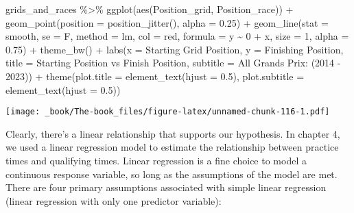 \documentclass[
]{book}
\newenvironment{Shaded}{\begin{snugshade}}{\end{snugshade}}
\newcommand{\AttributeTok}[1]{\textcolor[rgb]{0.77,0.63,0.00}{#1}}
\newcommand{\DecValTok}[1]{\textcolor[rgb]{0.00,0.00,0.81}{#1}}
\newcommand{\FloatTok}[1]{\textcolor[rgb]{0.00,0.00,0.81}{#1}}
\newcommand{\FunctionTok}[1]{\textcolor[rgb]{0.00,0.00,0.00}{#1}}
\newcommand{\NormalTok}[1]{#1}
\newcommand{\SpecialCharTok}[1]{\textcolor[rgb]{0.00,0.00,0.00}{#1}}
\newcommand{\StringTok}[1]{\textcolor[rgb]{0.31,0.60,0.02}{#1}}
\begin{document}
\begin{Shaded}
\begin{Highlighting}[]
\NormalTok{grids\_and\_races }\SpecialCharTok{\%\textgreater{}\%}
  \FunctionTok{ggplot}\NormalTok{(}\FunctionTok{aes}\NormalTok{(Position\_grid, Position\_race)) }\SpecialCharTok{+}
  \FunctionTok{geom\_point}\NormalTok{(}\AttributeTok{position =} \FunctionTok{position\_jitter}\NormalTok{(), }\AttributeTok{alpha =} \FloatTok{0.25}\NormalTok{) }\SpecialCharTok{+}
  \FunctionTok{geom\_line}\NormalTok{(}\AttributeTok{stat =} \StringTok{\textquotesingle{}smooth\textquotesingle{}}\NormalTok{, }\AttributeTok{se =}\NormalTok{ F, }\AttributeTok{method =} \StringTok{\textquotesingle{}lm\textquotesingle{}}\NormalTok{, }\AttributeTok{col =} \StringTok{\textquotesingle{}red\textquotesingle{}}\NormalTok{,}
              \AttributeTok{formula =}\NormalTok{ y }\SpecialCharTok{\textasciitilde{}} \DecValTok{0} \SpecialCharTok{+}\NormalTok{ x, }\AttributeTok{size =} \DecValTok{1}\NormalTok{, }\AttributeTok{alpha =} \FloatTok{0.75}\NormalTok{) }\SpecialCharTok{+}
  \FunctionTok{theme\_bw}\NormalTok{() }\SpecialCharTok{+}
  \FunctionTok{labs}\NormalTok{(}\AttributeTok{x  =} \StringTok{\textquotesingle{}Starting Grid Position\textquotesingle{}}\NormalTok{,}
       \AttributeTok{y =} \StringTok{\textquotesingle{}Finishing Position\textquotesingle{}}\NormalTok{,}
       \AttributeTok{title =} \StringTok{\textquotesingle{}Starting Position vs Finish Position\textquotesingle{}}\NormalTok{,}
       \AttributeTok{subtitle =} \StringTok{\textquotesingle{}All Grands Prix: (2014 {-} 2023)\textquotesingle{}}\NormalTok{) }\SpecialCharTok{+}
  \FunctionTok{theme}\NormalTok{(}\AttributeTok{plot.title =} \FunctionTok{element\_text}\NormalTok{(}\AttributeTok{hjust =} \FloatTok{0.5}\NormalTok{),}
        \AttributeTok{plot.subtitle =} \FunctionTok{element\_text}\NormalTok{(}\AttributeTok{hjust =} \FloatTok{0.5}\NormalTok{))}
\end{Highlighting}
\end{Shaded}

\texttt{[image: \_book/The-book\_files/figure-latex/unnamed-chunk-116-1.pdf]}

Clearly, there's a linear relationship that supports our hypothesis. In chapter 4, we used a linear regression model to estimate the relationship between practice times and qualifying times. Linear regression is a fine choice to model a continuous response variable, so long as the assumptions of the model are met. There are four primary assumptions associated with simple linear regression (linear regression with only one predictor variable):
\end{document}
